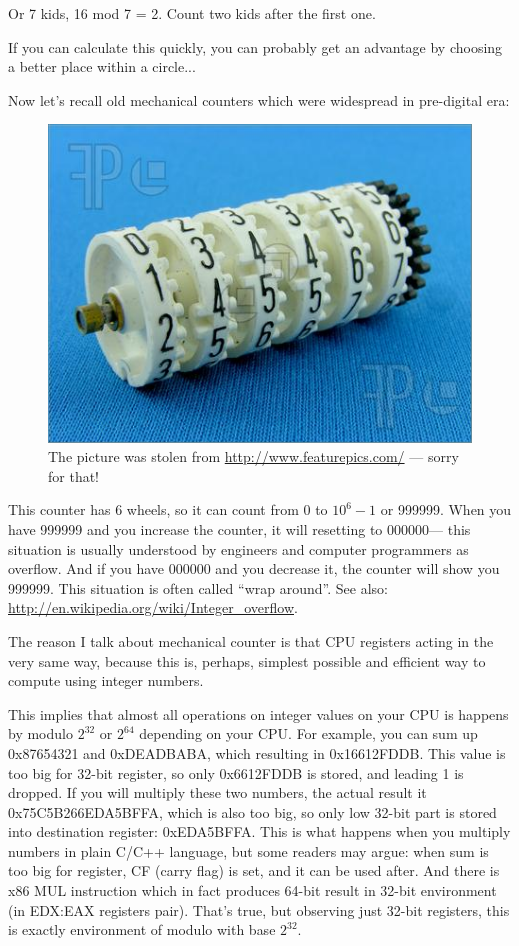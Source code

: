 Or 7 kids, 16 mod 7 = 2. Count two kids after the first one.

If you can calculate this quickly, you can probably get an advantage by choosing a better place within a circle...

\myhrule{}

Now let's recall old mechanical counters which were widespread in pre-digital era:

\begin{figure}[H]
\centering
\includegraphics[scale=0.66]{modulo/counter.jpg}
\caption{The picture was stolen from \url{http://www.featurepics.com/} --- sorry for that!}
\end{figure}

This counter has 6 wheels, so it can count from 0 to $10^{6}-1$ or 999999.
When you have 999999 and you increase the counter, it will resetting to 000000---
this situation is usually understood by engineers and computer programmers as overflow.
And if you have 000000 and you decrease it, the counter will show you 999999.
This situation is often called ``wrap around''.
See also: \url{http://en.wikipedia.org/wiki/Integer_overflow}.


The reason I talk about mechanical counter is that CPU registers acting in the very same way, because this is, perhaps, simplest possible and efficient way
to compute using integer numbers.

This implies that almost all operations on integer values on your CPU is happens by modulo $2^{32}$ or $2^{64}$ depending on your CPU.
For example, you can sum up 0x87654321 and 0xDEADBABA, which resulting in 0x16612FDDB.
This value is too big for 32-bit register, so only 0x6612FDDB is stored, and leading 1 is dropped.
If you will multiply these two numbers, the actual result it 0x75C5B266EDA5BFFA, which is also too big, so only low 32-bit part is stored into destination
register: 0xEDA5BFFA. This is what happens when you multiply numbers in plain C/C++ language, but some readers may argue:
when sum is too big for register, CF (carry flag) is set, and it can be used after.
And there is x86 MUL instruction which in fact produces 64-bit result in 32-bit environment (in EDX:EAX registers pair).
That's true, but observing just 32-bit registers, this is exactly environment of modulo with base $2^{32}$.

